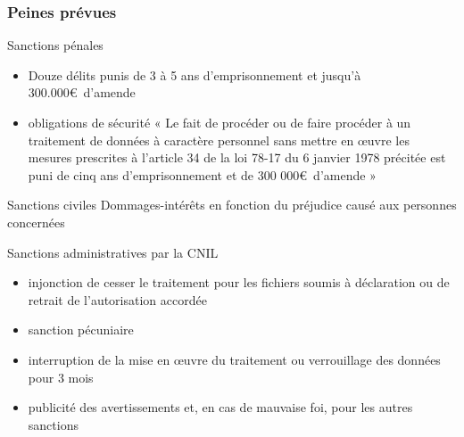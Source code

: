 \begin{reveals}
\begin{frame}
  \frametitle{Peines prévues}
   \vfill
   \begin{block}{Sanctions pénales}\small
    \begin{itemize}
    \item Douze délits punis de 3 à 5 ans d'emprisonnement et jusqu'à
      300.000\euro\ d'amende
    \item obligations de sécurité « Le fait de procéder ou de faire
      procéder à un traitement de données à caractère personnel sans
      mettre en \oe uvre les mesures prescrites à l'article 34 de la loi
      78-17 du 6 janvier 1978 précitée est puni de cinq ans
      d'emprisonnement et de 300 000\euro\ d'amende »
    \end{itemize}
  \end{block}
  \vfill
  \begin{block}{Sanctions civiles}\scriptsize
    Dommages-intérêts en fonction du préjudice causé aux personnes
    concernées
  \end{block}
  \vfill
  \begin{block}{Sanctions administratives par la CNIL}\scriptsize
    \begin{itemize}
    \item injonction de cesser le traitement pour les fichiers soumis
      à déclaration ou de retrait de l’autorisation accordée
    \item sanction pécuniaire
    \item interruption de la mise en \oe uvre du traitement ou
      verrouillage des données pour 3 mois
    \item publicité des avertissements et, en cas de mauvaise foi,
      pour les autres sanctions
    \end{itemize}
  \end{block}
  \vfill
\end{frame}


\end{reveals}

 
